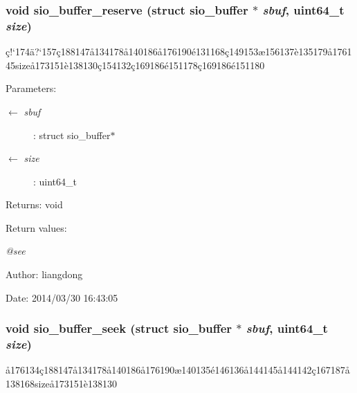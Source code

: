 \subsubsection{\setlength{\rightskip}{0pt plus 5cm}void sio\_\-buffer\_\-reserve (struct sio\_\-buffer $\ast$ {\em sbuf}, uint64\_\-t {\em size})}\label{sio__buffer_8c_a4}


\c{c}!`174\"{a}?`157\c{c}188147\aa{}134178\aa{}140186\aa{}176190\'{e}131168\c{c}149153\ae{}156137\`{e}135179\aa{}176145size\aa{}173151\`{e}138130\c{c}154132\c{c}169186\'{e}151178\c{c}169186\'{e}151180 

\begin{Desc}
\item[Parameters:]
\begin{description}
\item[\mbox{$\leftarrow$} {\em sbuf}]: struct sio\_\-buffer$\ast$ \item[\mbox{$\leftarrow$} {\em size}]: uint64\_\-t \end{description}
\end{Desc}
\begin{Desc}
\item[Returns:]void \end{Desc}
\begin{Desc}
\item[Return values:]
\begin{description}
\item[{\em @see}]\end{description}
\end{Desc}
\begin{Desc}
\item[Author:]liangdong \end{Desc}
\begin{Desc}
\item[Date:]2014/03/30 16:43:05 \end{Desc}
\subsubsection{\setlength{\rightskip}{0pt plus 5cm}void sio\_\-buffer\_\-seek (struct sio\_\-buffer $\ast$ {\em sbuf}, uint64\_\-t {\em size})}\label{sio__buffer_8c_a6}


\aa{}176134\c{c}188147\aa{}134178\aa{}140186\aa{}176190\ae{}140135\'{e}146136\aa{}144145\aa{}144142\c{c}167187\aa{}138168size\aa{}173151\`{e}138130 

